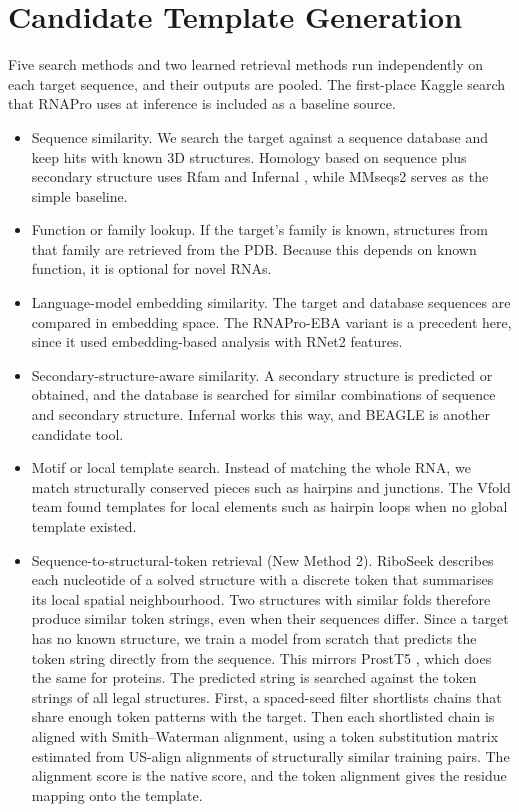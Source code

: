 \documentclass{FastFyp}
\begin{document}
\section{Candidate Template Generation}
Five search methods and two learned retrieval methods run independently on each target sequence, and their outputs are pooled. The first-place Kaggle search that RNAPro uses at inference is included as a baseline source.
\begin{itemize}
  \item Sequence similarity. We search the target against a sequence database and keep hits with known 3D structures. Homology based on sequence plus secondary structure uses Rfam and Infernal \cite{kalvari2018,nawrocki2013}, while MMseqs2 \cite{steinegger2017} serves as the simple baseline.
  \item Function or family lookup. If the target's family is known, structures from that family are retrieved from the PDB. Because this depends on known function, it is optional for novel RNAs.
  \item Language-model embedding similarity. The target and database sequences are compared in embedding space. The RNAPro-EBA variant is a precedent here, since it used embedding-based analysis \cite{pantolini2024} with RNet2 features.
  \item Secondary-structure-aware similarity. A secondary structure is predicted or obtained, and the database is searched for similar combinations of sequence and secondary structure. Infernal works this way, and BEAGLE is another candidate tool.
  \item Motif or local template search. Instead of matching the whole RNA, we match structurally conserved pieces such as hairpins and junctions. The Vfold team found templates for local elements such as hairpin loops when no global template existed.
  \item Sequence-to-structural-token retrieval (New Method 2). RiboSeek \cite{wang2026riboseek} describes each nucleotide of a solved structure with a discrete token that summarises its local spatial neighbourhood. Two structures with similar folds therefore produce similar token strings, even when their sequences differ. Since a target has no known structure, we train a model from scratch that predicts the token string directly from the sequence. This mirrors ProstT5 \cite{heinzinger2024prostt5}, which does the same for proteins. The predicted string is searched against the token strings of all legal structures. First, a spaced-seed filter shortlists chains that share enough token patterns with the target. Then each shortlisted chain is aligned with Smith--Waterman alignment, using a token substitution matrix estimated from US-align alignments of structurally similar training pairs. The alignment score is the native score, and the token alignment gives the residue mapping onto the template.

\end{itemize}
\end{document}
